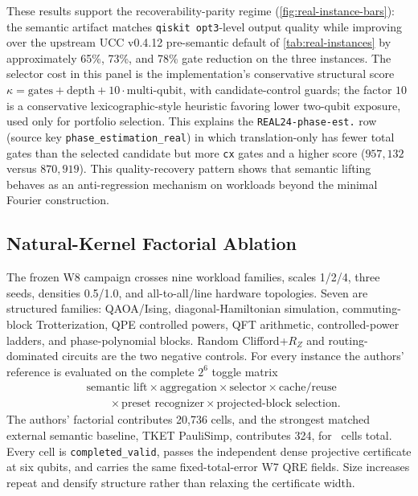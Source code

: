\documentclass[a4paper,twocolumn,10pt,unpublished]{quantumarticle}
\begin{document}
These results support the recoverability-parity regime
(\cref{fig:real-instance-bars}): the semantic artifact matches
\texttt{qiskit opt3}-level output quality while improving over the
upstream UCC v0.4.12 pre-semantic default of \cref{tab:real-instances} by
approximately 65\%, 73\%, and 78\% gate reduction on the three instances.
The selector cost in this panel is the implementation's conservative
structural score $\kappa = \text{gates} + \text{depth} +
10\cdot\text{multi-qubit}$, with candidate-control guards; the factor
$10$ is a conservative lexicographic-style heuristic favoring lower
two-qubit exposure, used only for portfolio selection. This explains the
\texttt{REAL24-phase-est.} row (source key
\texttt{phase\_estimation\_real}) in which translation-only has fewer
total gates than the selected candidate but more \texttt{cx} gates and a
higher score ($957{,}132$ versus $870{,}919$). This quality-recovery
pattern shows that semantic lifting behaves as an anti-regression
mechanism on workloads beyond the minimal Fourier construction.

\subsection{Natural-Kernel Factorial Ablation}
\label{sec:natural-factorial}

The frozen W8 campaign crosses nine workload families, scales 1/2/4, three
seeds, densities 0.5/1.0, and all-to-all/line hardware topologies.  Seven are
structured families: QAOA/Ising, diagonal-Hamiltonian simulation,
commuting-block Trotterization, QPE controlled powers, QFT arithmetic,
controlled-power ladders, and phase-polynomial blocks.  Random
Clifford+$R_Z$ and routing-dominated circuits are the two negative controls.
For every instance the authors' reference is evaluated on the complete
$2^6$ toggle matrix
\begin{equation*}
\begin{split}
&\text{semantic lift}\times\text{aggregation}\times\text{selector}
\times\text{cache/reuse}\\
&\qquad\times\text{preset recognizer}
\times\text{projected-block selection}.
\end{split}
\end{equation*}
The authors' factorial contributes 20,736 cells, and the strongest matched
external semantic baseline, TKET PauliSimp, contributes 324, for
\NaturalCells\ cells total.  Every cell is \texttt{completed\_valid}, passes
the independent dense projective certificate at six qubits, and carries the
same fixed-total-error W7 QRE fields.  Size increases repeat and densify
structure rather than relaxing the certificate width.
\end{document}
